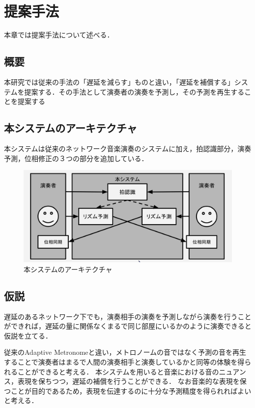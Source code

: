 \chapter{提案手法}
\label{proposed}

本章では提案手法について述べる．

\section{概要}
本研究では従来の手法の「遅延を減らす」ものと違い，「遅延を補償する」システムを提案する．その手法として演奏者の演奏を予測し，その予測を再生することを提案する

\section{本システムのアーキテクチャ}
本システムは従来のネットワーク音楽演奏のシステムに加え，拍認識部分，演奏予測，位相修正の３つの部分を追加している．

\begin{figure}[htbp]
  \centering
  \includegraphics[width=0.8\linewidth]{src/architecture.png}
  \caption{本システムのアーキテクチャ}
  \label{fig:architecture}
\end{figure}

\section{仮説}
遅延のあるネットワーク下でも，演奏相手の演奏を予測しながら演奏を行うことができれば，遅延の量に関係なくまるで同じ部屋にいるかのように演奏できると仮説を立てる．

従来のAdaptive Metronomeと違い，メトロノームの音ではなく予測の音を再生することで演奏者はまるで人間の演奏相手と演奏しているかと同等の体験を得られることができると考える．
本システムを用いると音楽における音のニュアンス，表現を保ちつつ，遅延の補償を行うことができる．
なお音楽的な表現を保つことが目的であるため，表現を伝達するのに十分な予測精度を得られればよいと考える．

